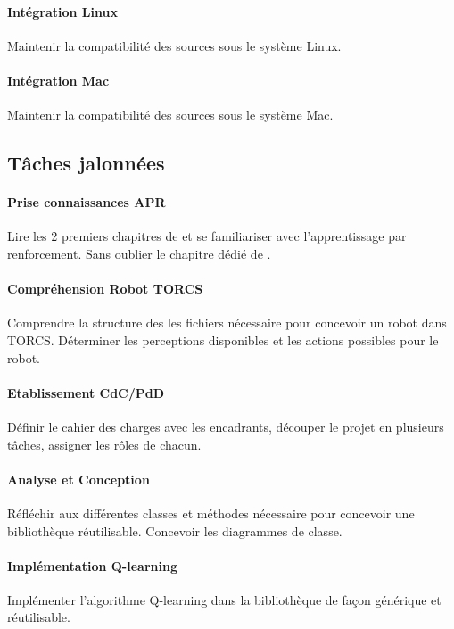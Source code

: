 \documentclass[a4paper,12pt]{article}
\begin{document}
      \paragraph{Intégration Linux} Maintenir la compatibilité des sources sous le système Linux.
      
      \paragraph{Intégration Mac} Maintenir la compatibilité des sources sous le système Mac.

    \subsection{Tâches jalonnées}
    
      \paragraph{Prise connaissances APR} Lire les 2 premiers chapitres de \cite{PDMIA} et se familiariser avec 
      l'apprentissage par renforcement. Sans oublier le chapitre dédié de \cite{IntArt}.
      
      \paragraph{Compréhension Robot TORCS} Comprendre la structure des les fichiers nécessaire pour concevoir un robot 
      dans TORCS. Déterminer les perceptions disponibles et les actions possibles pour le robot.
    
      \paragraph{Etablissement CdC/PdD} Définir le cahier des charges avec les encadrants, découper le projet en plusieurs
      tâches, assigner les rôles de chacun.
    
      \paragraph{Analyse et Conception} Réfléchir aux différentes classes et méthodes nécessaire pour concevoir une
      bibliothèque réutilisable. Concevoir les diagrammes de classe.
      
      \paragraph{Implémentation Q-learning} Implémenter l'algorithme Q-learning dans la bibliothèque de façon générique
      et réutilisable.
      
\end{document}
